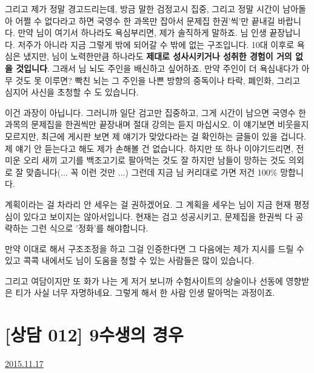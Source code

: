 그리고 제가 정말 경고드리는데, 방금 말한 검정고시 집중, 그리고 정말 시간이 남아돌아 어쩔 수 없다라고 하면
국영수 한 과목만 잡아서 문제집 한권'씩'만 끝내길 바랍니다.
만약 님이 여기서 하나라도 욕심부리면, 제가 솔직하게 말하죠. 님 인생 끝장납니다.
저주가 아니라 지금 그렇게 밖에 되어갈 수 밖에 없는 구조입니다.
10대 이후로 욕심은 냈지만, 님이 노력한만큼 하나라도 \textbf{제대로 성사시키거나 성취한 경험이 거의 없을 것입니다}.
그래서 님 뇌도 주인을 배신하고 싶어하죠. 만약 주인이 더 욕심내다가 아무 것도 못 이루면?
빡친 뇌는 그 주인을 나쁜 방향의 중독이나 타락, 폐인화, 그리고 심지어 사신을 초청할 수 도 있습니다.
\vspace{5mm}

이건 과장이 아닙니다.
그러니까 일단 검고만 집중하고, 그게 시간이 남으면 국영수 한 과목의 문제집을 한권씩만 끝장내며
절대 강의는 듣지 마십시오. 이 얘기보면 비웃을지 모르지만, 최근에 게시판 보면 제 얘기가 맞았다라는 걸 확인하는 글들이 있을 겁니다.
제 얘기 안 듣는다고 해도 제가 손해볼 건 없습니다.
하지만 또 하나 이야기드리면, 전 미운 오리 새끼 고기를 백조고기로 팔아먹는 것도 잘 하지만
남들이 망하는 것도 의외로 잘 맞춥니다(... 꼭 이런 것만 ...) 그런데 지금 님 커리대로 가면 저건 100$\%$ 망합니다.
\vspace{5mm}

계획이라는 걸 차라리 안 세우는 걸 권하겠어요. 그 계획을 세우는 님이 지금 현재 평정심이 있다고 보이지는 않아서입니다.
현재는 검고 성공시키고, 문제집을 한권씩 다 공략하는 그런 식으로 '정화'를 해야합니다.
\vspace{5mm}

만약 이대로 해서 구조조정을 하고 그걸 인증한다면 그 다음에는 제가 지시를 드릴 수 있고
콕콕 내에서도 님이 도움을 청할 수 있는 사람들은 많이 있습니다.
\vspace{5mm}

그리고 여담이지만 또 화가 나는 게
저거 보니까 수험사이트의 상술이나 선동에 영향받은 티가 사실 너무 자명하네요.
그렇게 해서 한 사람 인생 말아먹는 과정이죠.
\vspace{5mm}






\section{[상담 012] 9수생의 경우}
\href{https://www.kockoc.com/Apoc/496700}{2015.11.17}


        
    \vspace{5mm}

